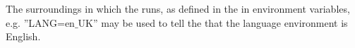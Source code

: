 \item[Environment]{
The surroundings in which the \gdaut runs, as defined in the  in environment variables, e.g. ''LANG=en$\_$UK'' may be used to tell the \gdaut that the language environment is English.
}

